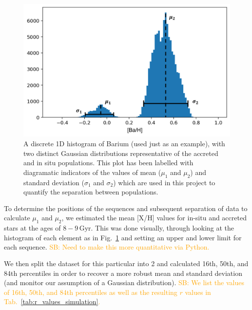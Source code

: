 \documentclass[fleqn,usenatbib]{mnras}
\newcommand{\SB}[1]{{\textcolor{orange}{SB: #1}}}
\begin{document}
\begin{figure}
	\includegraphics[width=\columnwidth]{figures/hist_labelled.png}
    \caption{A discrete 1D histogram of Barium (used just as an example), with two distinct Gaussian distributions representative of the accreted and in situ populations. This plot has been labelled with diagramatic indicators of the values of mean ($\mu_1$ and $\mu_2$) and standard deviation ($\sigma_1$ and $\sigma_2$) which are used in this project to quantify the separation between populations.}
    \label{fig:hist_labels}
\end{figure}

To determine the positions of the sequences and subsequent separation of data to calculate $\mu_1$ and $\mu_2$, we estimated the mean [X/H] values for in-situ and accreted stars at the ages of $8-9\,\mathrm{Gyr}$. This was done visually, through looking at the histogram of each element as in Fig.~\ref{fig:hist_labels} and setting an upper and lower limit for each sequence. \SB{Need to make this more quantitative via Python.}

We then split the dataset for this particular into 2 and calculated 16th, 50th, and 84th percentiles in order to recover a more robust mean and standard deviation (and monitor our assumption of a Gaussian distribution). \SB{We list the values of 16th, 50th, and 84th percentiles as well as the resulting $r$ values in Tab.~\ref{tab:r_values_simulation}.}
\end{document}

